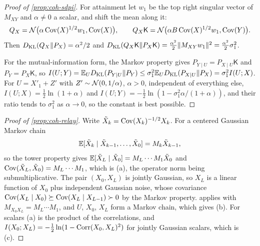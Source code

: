 \begin{proof}[Proof of \cref{prop:coh-sdpi}]
For attainment let $w_1$ be the top right singular vector of $M_{XY}$ and $\alpha\ne0$ a scalar, and shift the mean along it:
\[ Q_X=\mathcal{N}\bigl(\alpha\operatorname{Cov}(X)^{1/2}w_1,\operatorname{Cov}(X)\bigr),\qquad Q_X\mathsf K=\mathcal{N}\bigl(\alpha B\operatorname{Cov}(X)^{1/2}w_1,\operatorname{Cov}(Y)\bigr). \]
Then $D_{\mathrm{KL}}(Q_X\Vert P_X)=\alpha^2/2$ and $D_{\mathrm{KL}}(Q_X\mathsf K\Vert P_X\mathsf K)=\frac{\alpha^2}2\Vert M_{XY}w_1\Vert^2=\frac{\alpha^2}2\sigma_1^2$.

For the mutual-information form, the Markov property gives $P_{Y\mid U}=P_{X\mid U}\mathsf K$ and $P_Y=P_X\mathsf K$, so $I(U;Y)=\mathbb{E}_UD_{\mathrm{KL}}(P_{Y\mid U}\Vert P_Y)\le\sigma_1^2\mathbb{E}_UD_{\mathrm{KL}}(P_{X\mid U}\Vert P_X)=\sigma_1^2I(U;X)$. For $U=X'_1+Z'$ with $Z'\sim\mathcal{N}(0,1/\alpha)$, $\alpha>0$, independent of everything else, $I(U;X)=\frac12\ln(1+\alpha)$ and $I(U;Y)=-\frac12\ln(1-\sigma_1^2\alpha/(1+\alpha))$, and their ratio tends to $\sigma_1^2$ as $\alpha\to0$, so the constant is best possible.
\end{proof}

\begin{proof}[Proof of \cref{prop:coh-relay}]
Write $\tilde X_k=\operatorname{Cov}(X_k)^{-1/2}X_k$. For a centered Gaussian Markov chain
\[ \mathbb{E}[\tilde X_k\mid\tilde X_{k-1},\dots,\tilde X_0]=M_k\tilde X_{k-1}, \]
so the tower property gives $\mathbb{E}[\tilde X_L\mid\tilde X_0]=M_L\cdots M_1\tilde X_0$ and $\operatorname{Cov}(\tilde X_L,\tilde X_0)=M_L\cdots M_1$, which is (a), the operator norm being submultiplicative. The pair $(X_0,X_L)$ is jointly Gaussian, so $X_L$ is a linear function of $X_0$ plus independent Gaussian noise, whose covariance $\operatorname{Cov}(X_L\mid X_0)\succeq\operatorname{Cov}(X_L\mid X_{L-1})\succ0$ by the Markov property.  applies with $M_{X_0X_L}=M_L\cdots M_1$, and $U$, $X_0$, $X_L$ form a Markov chain, which gives (b). For scalars (a) is the product of the correlations, and $I(X_0;X_L)=-\frac12\ln(1-\operatorname{Corr}(X_0,X_L)^2)$ for jointly Gaussian scalars, which is (c).
\end{proof}

